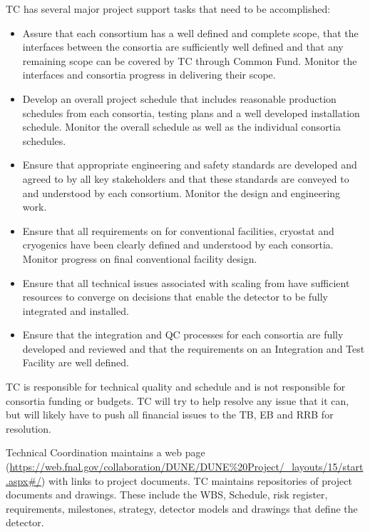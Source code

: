


TC has several major project support tasks that need to be accomplished:
\begin{itemize}
  \item Assure that each consortium has a well defined and complete
    scope, that the interfaces between the consortia are sufficiently
    well defined and that any remaining scope can be covered by TC
    through Common Fund. Monitor the interfaces and consortia progress
    in delivering their scope.
  \item Develop an overall project schedule that includes reasonable
    production schedules from each consortia, testing plans and a well
    developed installation schedule. Monitor the overall schedule as
    well as the individual consortia schedules.
  \item Ensure that appropriate engineering and safety standards are
    developed and agreed to by all key stakeholders and that these
    standards are conveyed to and understood by each
    consortium. Monitor the design and engineering work.
  \item Ensure that all  requirements on  for
    conventional facilities, cryostat and cryogenics have been clearly
    defined and understood by each consortia. Monitor 
    progress on final conventional facility design.
  \item Ensure that all technical issues associated with scaling from
     have sufficient resources to converge on
    decisions that enable the detector to be fully integrated and
    installed.
  \item Ensure that the integration and QC processes for each
    consortia are fully developed and reviewed and that the
    requirements on an Integration and Test Facility are well defined.
\end{itemize}

TC is responsible for technical quality and schedule and is not
responsible for consortia funding or budgets.  TC will try to help
resolve any issue that it can, but will likely have to push all
financial issues to the TB, EB and RRB for resolution.

Technical Coordination maintains a web page
(\url{https://web.fnal.gov/collaboration/DUNE/DUNE\%20Project/\_layouts/15/start.aspx\#/})
with links to project documents. TC maintains repositories of project
documents and drawings. These include the WBS, Schedule, risk
register, requirements, milestones, strategy, detector models and
drawings that define the  detector.


